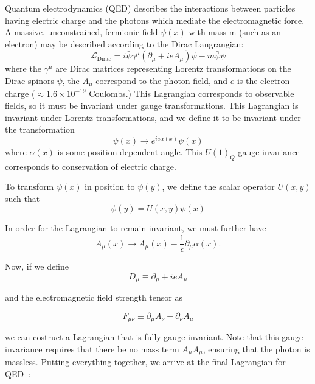Quantum electrodynamics (QED) describes the interactions between particles having electric charge and the photons which mediate the electromagnetic force. A massive, unconstrained, fermionic field $\psi(x)$ with mass m (such as an electron) may be described according to the Dirac Langrangian\cite{srednicki}:
\begin{equation}
\mathcal{L}_{\text{Dirac}} = i\bar{\psi}\gamma^{\mu}\left(\partial_{\mu} + ieA_{\mu}\right)\psi - m\bar{\psi}\psi
\end{equation}
where the $\gamma^{\mu}$ are Dirac matrices representing Lorentz transformations on the Dirac spinors $\psi$, the $A_{\mu}$ correspond to the photon field, and $e$ is the electron charge ($\approx 1.6 \times 10^{-19}$ Coulombs.) This Lagrangian corresponds to observable fields, so it must be invariant under gauge transformations. This Lagrangian is invariant under Lorentz transformations, and we define it to be invariant under the transformation
\begin{equation}
\psi(x) \to e^{ie\alpha(x)}\psi(x)
\end{equation}
where $\alpha(x)$ is some position-dependent angle. This $U(1)_Q$ gauge invariance corresponds to conservation of electric charge.

To transform $\psi(x)$ in position to $\psi(y)$, we define the scalar operator $U(x, y)$ such that
\begin{equation}
\psi(y) = U(x, y)\psi(x)
\end{equation}

\noindent In order for the Lagrangian to remain invariant, we must further have
\begin{equation}
A_{\mu}(x) \to A_{\mu}(x) - \frac{1}{\epsilon}\partial_{\mu}\alpha(x).
\end{equation}

\noindent Now, if we define
\begin{equation}
D_{\mu} \equiv \partial_{\mu} + ieA_{\mu}
\end{equation}

\noindent and the electromagnetic field strength tensor as

\begin{equation}
 F_{\mu\nu} \equiv \partial_{\mu}A_{\nu} - \partial_{\nu}A_{\mu}
\end{equation}

\noindent we can costruct a Lagrangian that is fully gauge invariant. Note that this gauge invariance requires that there be no mass term $A_{\mu}A_{\mu}$, ensuring that the photon is massless. Putting everything together, we arrive at the final Lagrangian for QED~\cite{halzen}:

